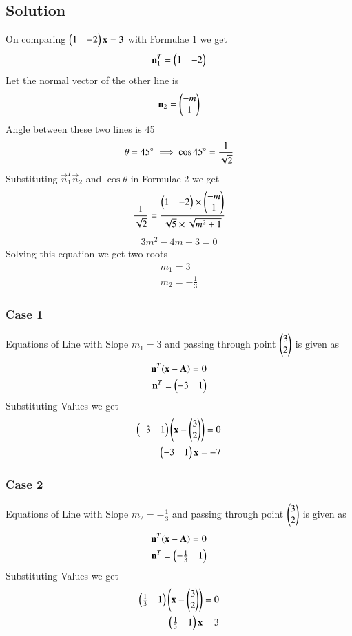 \documentclass[journal,12pt,twocolumn]{IEEEtran}
\begin{document}
\subsection{Solution}
On comparing $\begin{pmatrix}1 & -2\end{pmatrix}\mathbf{x} = 3$ with Formulae 1  we get 
\begin{align}
\mathbf{n}_1^T=\begin{pmatrix}1 & -2\end{pmatrix}
\end{align}
Let the normal vector of the other line is
\begin{align}
\mathbf{n}_2=\begin{pmatrix}-m\\1\end{pmatrix}  
\end{align}
Angle between these two lines is 45\degree
\begin{align}
    \theta=45\degree
    \implies \cos 45\degree &=\frac{1}{\sqrt{2}}\\ 
\end{align}
Substituting $\vec{n}_1^T \vec{n}_2$ and $\cos\theta$ in Formulae 2  we get
\begin{align}
    \frac{1}{\sqrt{2}}=\frac{\begin{pmatrix}1 & -2\end{pmatrix}\times\begin{pmatrix}-m\\1\end{pmatrix}}{\sqrt{5}\times\sqrt{m^2+1}}
\end{align}
\begin{align}
    3m^2-4m-3=0
\end{align}
Solving this equation we get two roots
\begin{align}
m_1=3\\
m_2=-\frac{1}{3}
\end{align}
\subsubsection{Case 1}
Equations of Line with Slope $m_1=3$ and passing through point $\begin{pmatrix}3\\2\end{pmatrix}$ is given as
\begin{align}
   \mathbf{n}^T(\mathbf{x}-\mathbf{A})=0\\
   \mathbf{n}^T=\begin{pmatrix}-3 & 1\end{pmatrix}
\end{align}
Substituting Values we get
\begin{align}
 \begin{pmatrix}-3 & 1\end{pmatrix}\left(\mathbf{x}-\begin{pmatrix}3\\2\end{pmatrix}\right)=0\\
 \begin{pmatrix}-3 & 1\end{pmatrix}\mathbf{x}=-7
\end{align}
\subsubsection{Case 2}
Equations of Line with Slope $m_2=-\frac{1}{3}$ and passing through point $\begin{pmatrix}3\\2\end{pmatrix}$ is given as
\begin{align}
\mathbf{n}^T(\mathbf{x}-\mathbf{A})=0\\
\mathbf{n}^T=\begin{pmatrix}-\frac{1}{3} & 1\end{pmatrix}
\end{align}
Substituting Values we get
\begin{align}
 \begin{pmatrix}\frac{1}{3} & 1\end{pmatrix}\left(\mathbf{x}-\begin{pmatrix}3\\2\end{pmatrix}\right)=0\\
 \begin{pmatrix}\frac{1}{3} & 1\end{pmatrix}\mathbf{x}=3
\end{align}
\end{document}
